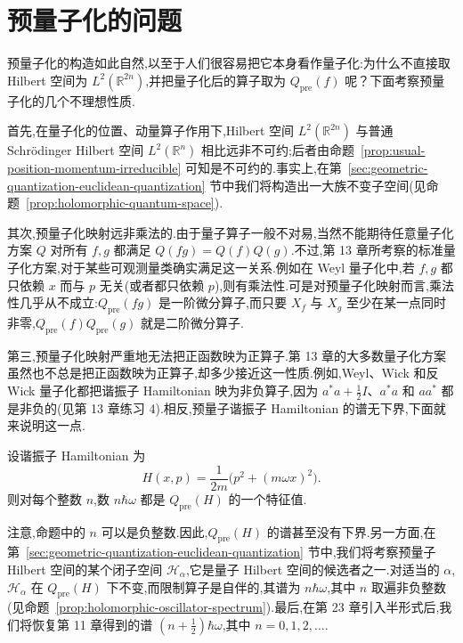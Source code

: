 \section{预量子化的问题}
\label{sec:problems-with-prequantization}

预量子化的构造如此自然,以至于人们很容易把它本身看作量子化:为什么不直接取 Hilbert 空间为 $L^2(\mathbb R^{2n})$,并把量子化后的算子取为 $Q_{\mathrm{pre}}(f)$ 呢？下面考察预量子化的几个不理想性质.

首先,在量子化的位置、动量算子作用下,Hilbert 空间 $L^2(\mathbb R^{2n})$ 与普通 Schrödinger Hilbert 空间 $L^2(\mathbb R^n)$ 相比远非不可约;后者由命题~\ref{prop:usual-position-momentum-irreducible} 可知是不可约的.事实上,在第~\ref{sec:geometric-quantization-euclidean-quantization} 节中我们将构造出一大族不变子空间(见命题~\ref{prop:holomorphic-quantum-space}).

其次,预量子化映射远非乘法的.由于量子算子一般不对易,当然不能期待任意量子化方案 $Q$ 对所有 $f,g$ 都满足 $Q(fg)=Q(f)Q(g)$.不过,第 13 章所考察的标准量子化方案,对于某些可观测量类确实满足这一关系.例如在 Weyl 量子化中,若 $f,g$ 都只依赖 $x$ 而与 $p$ 无关(或者都只依赖 $p$),则有乘法性.可是对预量子化映射而言,乘法性几乎从不成立:$Q_{\mathrm{pre}}(fg)$ 是一阶微分算子,而只要 $X_f$ 与 $X_g$ 至少在某一点同时非零,$Q_{\mathrm{pre}}(f)Q_{\mathrm{pre}}(g)$ 就是二阶微分算子.

第三,预量子化映射严重地无法把正函数映为正算子.第 13 章的大多数量子化方案虽然也不总是把正函数映为正算子,却多少接近这一性质.例如,Weyl、Wick 和反 Wick 量子化都把谐振子 Hamiltonian 映为非负算子,因为 $a^*a+\tfrac12I$、$a^*a$ 和 $aa^*$ 都是非负的(见第 13 章练习 4).相反,预量子谐振子 Hamiltonian 的谱无下界,下面就来说明这一点.

\begin{proposition}[预量子谐振子的谱]
\label{prop:prequantum-harmonic-oscillator}
设谐振子 Hamiltonian 为
\[
 H(x,p)=\frac{1}{2m}\bigl(p^2+(m\omega x)^2\bigr).
\]
则对每个整数 $n$,数 $n\hbar\omega$ 都是 $Q_{\mathrm{pre}}(H)$ 的一个特征值.
\end{proposition}

注意,命题中的 $n$ 可以是负整数.因此,$Q_{\mathrm{pre}}(H)$ 的谱甚至没有下界.另一方面,在第~\ref{sec:geometric-quantization-euclidean-quantization} 节中,我们将考察预量子 Hilbert 空间的某个闭子空间 $\mathcal H_\alpha$,它是量子 Hilbert 空间的候选者之一.对适当的 $\alpha$,$\mathcal H_\alpha$ 在 $Q_{\mathrm{pre}}(H)$ 下不变,而限制算子是自伴的,其谱为 $n\hbar\omega$,其中 $n$ 取遍非负整数(见命题~\ref{prop:holomorphic-oscillator-spectrum}).最后,在第 23 章引入半形式后,我们将恢复第 11 章得到的谱 $(n+\tfrac12)\hbar\omega$,其中 $n=0,1,2,\ldots$.

